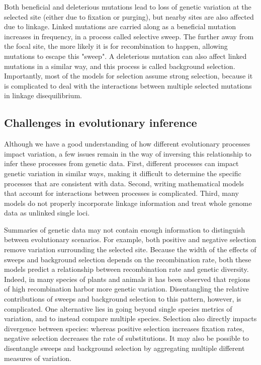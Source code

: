 Both beneficial and deleterious mutations lead to loss of genetic variation at the selected site (either due to fixation or purging),
but nearby sites are also affected due to linkage.
Linked mutations are carried along as a beneficial mutation increases in frequency, in a process called selective sweep.
The further away from the focal site, the more likely it is for recombination to happen, allowing mutations to escape this "sweep".
A deleterious mutation can also affect linked mutations in a similar way, and this process is called background selection.
Importantly, most of the models for selection assume strong selection,
because it is complicated to deal with the interactions between multiple selected mutations in linkage disequilibrium.

\subsection{Challenges in evolutionary inference}
%
Although we have a good understanding of how different evolutionary processes impact variation,
a few issues remain in the way of inversing this relationship to infer these processes from genetic data.
First, different processes can impact genetic variation in similar ways, making it difficult to determine the specific processes that are consistent with data.
Second, writing mathematical models that account for interactions between processes is complicated.
Third, many models do not properly incorporate linkage information and treat whole genome data as unlinked single loci.

Summaries of genetic data may not contain enough information to distinguish between evolutionary scenarios.
For example, both positive and negative selection remove variation surrounding the selected site.
Because the width of the effects of sweeps and background selection depends on the recombination rate,
both these models predict a relationship between recombination rate and genetic diversity.
Indeed, in many species of plants and animals it has been observed that regions of high recombination harbor more genetic variation.
Disentangling the relative contributions of sweeps and background selection to this pattern, however, is complicated.
One alternative lies in going beyond single species metrics of variation, and to instead compare multiple species.
Selection also directly impacts divergence between species: whereas positive selection increases fixation rates, 
negative selection decreases the rate of substitutions.
It may also be possible to disentangle sweeps and background selection by aggregating multiple different measures of variation. %

